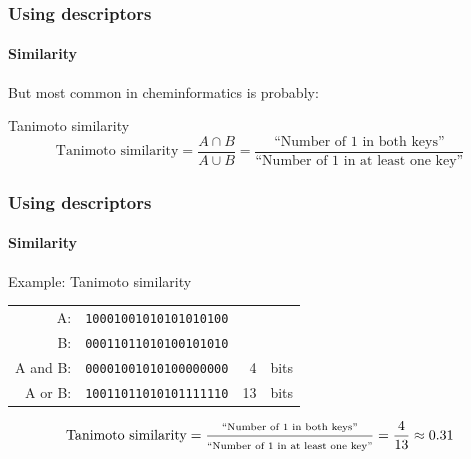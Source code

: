 \documentclass[aspectratio=169,dvipsnames]{beamer}
\begin{document}
    \begin{frame}
        \frametitle{Using descriptors}
        \framesubtitle{Similarity}
        But most common in cheminformatics is probably:
        \begin{block}{Tanimoto similarity}
            {\small
            \begin{equation*}
            \mbox{Tanimoto similarity}=\frac{A \cap B}{ A \cup B}
                                    =\frac{\text{``Number of 1 in both keys''}}{\text{``Number of 1 in at least one key''}}
            \end{equation*}}
        \end{block}
     \end{frame}


    \begin{frame}
        \frametitle{Using descriptors}
        \framesubtitle{Similarity}
        \begin{block}{Example: Tanimoto similarity}
        \centering
            \begin{tabular}{rlr@{ }l}
            \toprule
            A:       & \texttt{10001001010101010100} \\
            B:       & \texttt{00011011010100101010} \\ [5pt]
            A and B: & \texttt{00001001010100000000} & 4&bits \\ [5pt]
            A or B:  & \texttt{10011011010101111110} & 13&bits \\
            \bottomrule
            \end{tabular}
            {\small\begin{equation*}
                \text{Tanimoto similarity}=\frac{\text{\scriptsize``Number of 1 in both keys''}}{\text{\scriptsize``Number of 1 in at least one key''}}=\frac{4}{13}\approx0.31
            \end{equation*}}
        \end{block}
    \end{frame}
\end{document}
